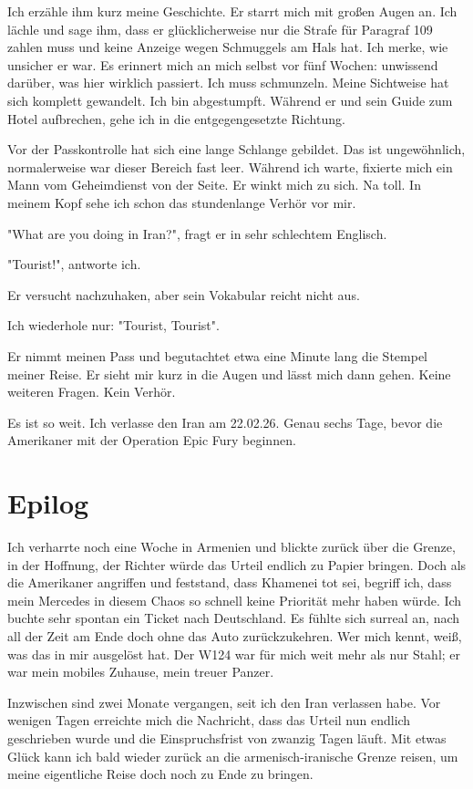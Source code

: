 Ich erzähle ihm kurz meine Geschichte. Er starrt mich mit großen Augen an. Ich lächle und sage ihm, dass er glücklicherweise nur die Strafe für Paragraf 109 zahlen muss und keine Anzeige wegen Schmuggels am Hals hat. Ich merke, wie unsicher er war. Es erinnert mich an mich selbst vor fünf Wochen: unwissend darüber, was hier wirklich passiert. Ich muss schmunzeln. Meine Sichtweise hat sich komplett gewandelt. Ich bin abgestumpft. Während er und sein Guide zum Hotel aufbrechen, gehe ich in die entgegengesetzte Richtung.

Vor der Passkontrolle hat sich eine lange Schlange gebildet. Das ist ungewöhnlich, normalerweise war dieser Bereich fast leer. Während ich warte, fixierte mich ein Mann vom Geheimdienst von der Seite. Er winkt mich zu sich. Na toll. In meinem Kopf sehe ich schon das stundenlange Verhör vor mir.

"What are you doing in Iran?", fragt er in sehr schlechtem Englisch.

"Tourist!", antworte ich.

Er versucht nachzuhaken, aber sein Vokabular reicht nicht aus.

Ich wiederhole nur: "Tourist, Tourist".

Er nimmt meinen Pass und begutachtet etwa eine Minute lang die Stempel meiner Reise. Er sieht mir kurz in die Augen und lässt mich dann gehen. Keine weiteren Fragen. Kein Verhör.

Es ist so weit. Ich verlasse den Iran am 22.02.26. Genau sechs Tage, bevor die Amerikaner mit der Operation Epic Fury beginnen.

\chapter*{Epilog}

Ich verharrte noch eine Woche in Armenien und blickte zurück über die Grenze, in der Hoffnung, der Richter würde das Urteil endlich zu Papier bringen. Doch als die Amerikaner angriffen und feststand, dass Khamenei tot sei, begriff ich, dass mein Mercedes in diesem Chaos so schnell keine Priorität mehr haben würde. Ich buchte sehr spontan ein Ticket nach Deutschland. Es fühlte sich surreal an, nach all der Zeit am Ende doch ohne das Auto zurückzukehren. Wer mich kennt, weiß, was das in mir ausgelöst hat. Der W124 war für mich weit mehr als nur Stahl; er war mein mobiles Zuhause, mein treuer Panzer.

Inzwischen sind zwei Monate vergangen, seit ich den Iran verlassen habe. Vor wenigen Tagen erreichte mich die Nachricht, dass das Urteil nun endlich geschrieben wurde und die Einspruchsfrist von zwanzig Tagen läuft. Mit etwas Glück kann ich bald wieder zurück an die armenisch-iranische Grenze reisen, um meine eigentliche Reise doch noch zu Ende zu bringen.

